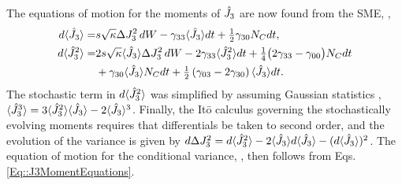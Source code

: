 The equations of motion for the moments of $\hat{J}_3$ are now found from the SME, ,
	\begin{subequations} \label{Eq::J3MomentEquations}
	\begin{align} 
		d \langle{\hat{J}_3}\rangle =& s \sqrt{\kappa} \Delta J_3^2 \, dW - \gamma_{33} \langle{\hat{J}_3}\rangle dt + \mbox{$\frac{1}{2}$} \gamma_{30} N_C dt ,  \\
		d \langle{\hat{J}_3^2}\rangle =& 2 s\sqrt{\kappa} \langle{\hat{J}_3}\rangle\Delta J_3^2 \, dW - 2 \gamma_{33} \langle{\hat{J}_3^2}\rangle dt + \mbox{$\frac{1}{4}$} \big( 2 \gamma_{33}-\gamma_{00}\big) N_C dt \\
		&+ \gamma_{30} \langle{\hat{J}_3}\rangle N_C dt + \mbox{$\frac{1}{2}$}\left(\gamma_{03} -2 \gamma_{30}\right) \langle{\hat{J}_3}\rangle dt. \nonumber 
	\end{align}
	\end{subequations}
The stochastic term in $d\langle{\hat{J}_3^2}\rangle$ was simplified by assuming Gaussian statistics \cite{jacobs_straightforward_2006}, $\langle{\hat{J}_3^3}\rangle = 3\langle{\hat{J}_3^2}\rangle\langle{\hat{J}_3}\rangle- 2\langle{\hat{J}_3}\rangle^3$. 
Finally, the It\={o} calculus governing the stochastically evolving moments requires that differentials be taken to second order, and the evolution of the variance is given by $d \Delta J_3^2 = d \langle{\hat{J}_3^2}\rangle - 2 \langle{\hat{J}_3}\rangle d \langle{\hat{J}_3}\rangle - ( d \langle{\hat{J}_3}\rangle )^2$. 
The equation of motion for the conditional variance, , then follows from Eqs. \eqref{Eq::J3MomentEquations}.
